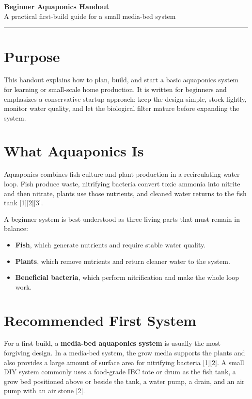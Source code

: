 \documentclass[11pt]{article}
\begin{document}
\begin{center}
  {\LARGE \textbf{Beginner Aquaponics Handout}}\\[0.5em]
  {\large A practical first-build guide for a small media-bed system}\\[0.75em]
  \rule{0.9\linewidth}{0.6pt}
\end{center}

\section*{Purpose}
This handout explains how to plan, build, and start a basic aquaponics system for learning or small-scale home production. It is written for beginners and emphasizes a conservative startup approach: keep the design simple, stock lightly, monitor water quality, and let the biological filter mature before expanding the system.

\section*{What Aquaponics Is}
Aquaponics combines fish culture and plant production in a recirculating water loop. Fish produce waste, nitrifying bacteria convert toxic ammonia into nitrite and then nitrate, plants use those nutrients, and cleaned water returns to the fish tank [1][2][3].

A beginner system is best understood as three living parts that must remain in balance:
\begin{itemize}
  \item \textbf{Fish}, which generate nutrients and require stable water quality.
  \item \textbf{Plants}, which remove nutrients and return cleaner water to the system.
  \item \textbf{Beneficial bacteria}, which perform nitrification and make the whole loop work.
\end{itemize}

\section*{Recommended First System}
For a first build, a \textbf{media-bed aquaponics system} is usually the most forgiving design. In a media-bed system, the grow media supports the plants and also provides a large amount of surface area for nitrifying bacteria [1][2]. A small DIY system commonly uses a food-grade IBC tote or drum as the fish tank, a grow bed positioned above or beside the tank, a water pump, a drain, and an air pump with an air stone [2].
\end{document}
